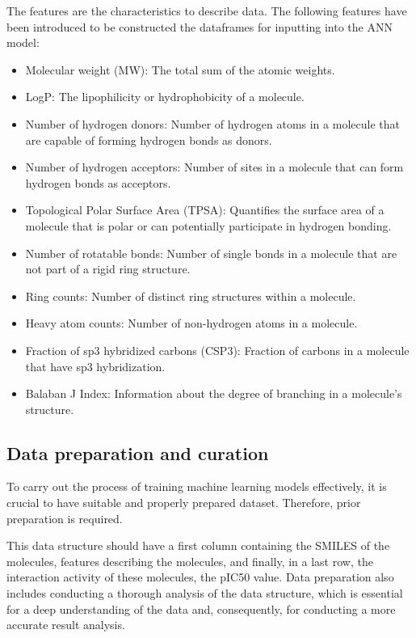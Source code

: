 \documentclass[final,times,twocolumn,article]{elsarticle}
\begin{document}
The features are the characteristics to describe data. The following features have been introduced to be constructed the dataframes for inputting into the ANN model:
\begin{itemize}
    \item Molecular weight (MW): The total sum of the atomic weights. 
    \item LogP: The lipophilicity or hydrophobicity of a molecule.
    \item Number of hydrogen donors: Number of hydrogen atoms in a molecule that are capable of forming hydrogen bonds as donors.
    \item Number of hydrogen acceptors: Number of sites in a molecule that can form hydrogen bonds as acceptors.
    \item Topological Polar Surface Area (TPSA): Quantifies the surface area of a molecule that is polar or can potentially participate in hydrogen bonding.
    \item Number of rotatable bonds: Number of single bonds in a molecule that are not part of a rigid ring structure.
    \item Ring counts: Number of distinct ring structures within a molecule.
    \item Heavy atom counts: Number of non-hydrogen atoms in a molecule.
    \item Fraction of sp3 hybridized carbons (CSP3): Fraction of carbons in a molecule that have sp3 hybridization.
    \item Balaban J Index: Information about the degree of branching in a molecule's structure.
\end{itemize}
\subsection{Data preparation and curation}

To carry out the process of training machine learning models effectively, it is crucial to have suitable and properly prepared dataset. Therefore, prior preparation is required. 

This data structure should have a first column containing the SMILES of the molecules, features describing the molecules, and finally, in a last row, the interaction activity of these molecules, the pIC50 value. Data preparation also includes conducting a thorough analysis of the data structure, which is essential for a deep understanding of the data and, consequently, for conducting a more accurate result analysis. 
\end{document}
